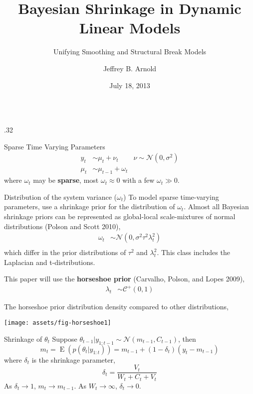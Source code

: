 \documentclass[final]{beamer}
\title{Bayesian Shrinkage in Dynamic Linear Models}
\subtitle{Unifying Smoothing and Structural Break Models}
\author{Jeffrey B. Arnold}
\institute[University of Rochester]{University of Rochester}
\date[2013-07-18]{July 18, 2013}
\DeclareMathOperator{\E}{E}
\newcommand{\dist}[1]{\mathcal{#1}}
\newcommand{\paren}[1]{\ensuremath{\left(#1\right)}}
\newcommand{\dnorm}[1]{\ensuremath{\dist{N}\paren{#1}}}
\newcommand{\dhalfcauchy}[1]{\ensuremath{\dist{C}^{+}\paren{#1}}}
\def \ColTwo {.32\textwidth}
\begin{document}
\begin{frame}[fragile]
  \begin{columns}[t]

    \begin{column}{\ColTwo}

      \begin{block}{Sparse Time Varying Parameters}
        \begin{align*}
          y_{t} &\sim \mu_{t} + \nu_{t} & \nu \sim \dnorm{0, \sigma^{2}} \\
          \mu_{t} & \sim \mu_{t-1} + \omega_{t}
        \end{align*}
        where $\omega_{t}$ may be \textbf{sparse}, most $\omega_{t} \approx 0$ with a few $\omega_{t} \gg 0$.
      \end{block}

      \begin{block}{Distribution of the system variance ($\omega_{t}$)}
        To model sparse time-varying parameters, use a shrinkage prior for the distribution of $\omega_{t}$.
        Almost all Bayesian shrinkage priors can be represented as global-local scale-mixtures of normal distributions (Polson and Scott 2010),
        \begin{align*}
          \omega_{t} & \sim \dnorm{0, \sigma^{2} \tau^{2} \lambda^{2}_{t}} \\
        \end{align*}
        which differ in the prior distributions of $\tau^{2}$ and $\lambda^{2}_{t}$.
        This class includes the Laplacian and t-distributions.

        \vspace{1ex}
        This paper will use the \textbf{horseshoe prior} (Carvalho, Polson, and Lopes 2009),
        \begin{align*}
          \lambda_{t} &\sim \dhalfcauchy{0, 1}
        \end{align*}
        
        \vspace{1ex}
        The horseshoe prior distribution density compared to other distributions,
        \begin{center}
          \texttt{[image: assets/fig-horseshoe1]}
        \end{center}
      \end{block}

      \begin{block}{Shrinkage of $\theta_{t}$}
        Suppose $\theta_{t - 1} | y_{1:t - 1} \sim \dnorm{m_{t-1}, C_{t-1}}$, then
        \begin{equation}
          m_{t} = \E (p(\theta_{t} | y_{1:t})) = m_{t-1} + (1 - \delta_{t}) (y_{t} - m_{t-1})
        \end{equation}
        where $\delta_{t}$ is the shrinkage parameter,
        \begin{equation}
          \delta_{t} = \frac{V_{t}}{W_{t} + C_{t} + V_{t}}
        \end{equation}
        As $\delta_{t} \to 1$, $m_{t} \to m_{t - 1}$. As $W_{t} \to \infty$, $\delta_{t} \to 0$.


\end{block}
\end{column}
\end{columns}
\end{frame}
\end{document}
